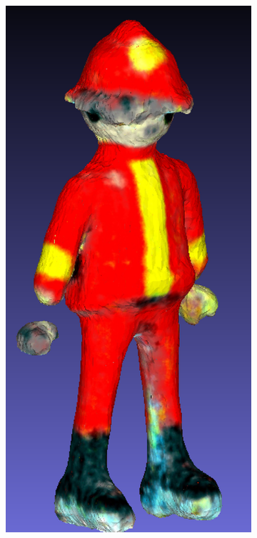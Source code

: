 \begin{figure}[ht]
    \centering
    \small
    \begin{subfigure}[b]{0.18\textwidth}
        \centering
        \includegraphics[width=\textwidth]{figures/subjective/dreamfusion_playmobil_result_resize.png}

\end{subfigure}
\end{figure}
